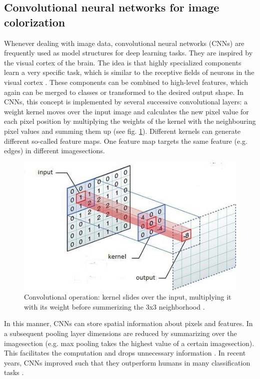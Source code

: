 \documentclass[12pt,letterpaper]{article}
\begin{document}
\subsection{Convolutional neural networks for image colorization}
Whenever dealing with image data, convolutional neural networks (CNNs) are frequently used as model structures for deep learning tasks. They are inspired by the visual cortex of the brain. The idea is that highly specialized components learn a very specific task, which is similar to the receptive fields of neurons in the visual cortex \citep{Hubel1962}. These components can be combined to high-level features, which again can be merged to classes or transformed to the desired output shape. In CNNs, this concept is implemented by several successive convolutional layers: a weight kernel moves over the input image and calculates the new pixel value for each pixel position by multiplying the weights of the kernel with the neighbouring pixel values and summing them up (see fig. \ref{convolut}). Different kernels can generate different so-called feature maps. One feature map targets the same feature (e.g. edges) in different imagesections.
\begin{figure}
	\centering
	\includegraphics[width=.48\textwidth]{cnn.png}
	\caption{Convolutional operation: kernel slides over the input, multiplying it with its weight before summerizing the 3x3 neighborhood \citep{Escontrela.2018}.}
	\label{convolut}
\end{figure}
In this manner, CNNs can store spatial information about pixels and features. In a subsequent pooling layer dimensions are reduced by summarizing over the imagesection (e.g. max pooling takes the highest value of a certain imagesection). This facilitates the computation and drops unnecessary information \citep{Lecture.2019}. In recent years, CNNs improved such that they outperform humans in many classification tasks \citep{Russakovsky.2014}.
\end{document}
